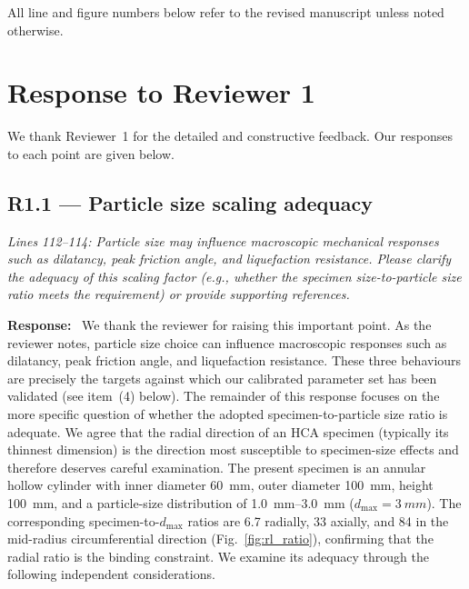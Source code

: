 \documentclass[11pt,a4paper]{article}
\newenvironment{rcomment}
  {\begin{leftbar}\color{black!75}\itshape}
  {\end{leftbar}\vspace{0.3em}}
\newcommand{\response}{\par\noindent\textbf{Response:}\ \ignorespaces}
\begin{document}
All line and figure numbers below refer to the revised manuscript unless
noted otherwise.

\clearpage


\section*{Response to Reviewer 1}

We thank Reviewer~1 for the detailed and constructive feedback. Our
responses to each point are given below.

\subsection*{R1.1 --- Particle size scaling adequacy}

\begin{rcomment}
Lines 112--114: Particle size may influence macroscopic mechanical responses
such as dilatancy, peak friction angle, and liquefaction resistance. Please
clarify the adequacy of this scaling factor (e.g., whether the specimen
size-to-particle size ratio meets the requirement) or provide supporting
references.
\end{rcomment}

\response
We thank the reviewer for raising this important point. As the
reviewer notes, particle size choice can influence macroscopic
responses such as dilatancy, peak friction angle, and liquefaction
resistance. These three behaviours are precisely the targets against
which our calibrated parameter set has been validated (see item~(4)
below). The remainder of this response focuses on the more specific
question of whether the adopted specimen-to-particle size ratio is
adequate. We agree that the radial direction of an HCA specimen
(typically its thinnest dimension) is the direction most susceptible
to specimen-size effects and therefore deserves careful examination.
The present specimen is an annular hollow cylinder with inner
diameter \SI{60}{mm}, outer diameter \SI{100}{mm}, height
\SI{100}{mm}, and a particle-size distribution of
\SIrange{1.0}{3.0}{mm} ($d_{\max}=\SI{3}{mm}$). The corresponding
specimen-to-$d_{\max}$ ratios are 6.7 radially, 33 axially, and 84
in the mid-radius circumferential direction
(Fig.~\ref{fig:rl_ratio}), confirming that the radial ratio is the
binding constraint. We examine its adequacy through the following
independent considerations.
\end{document}

